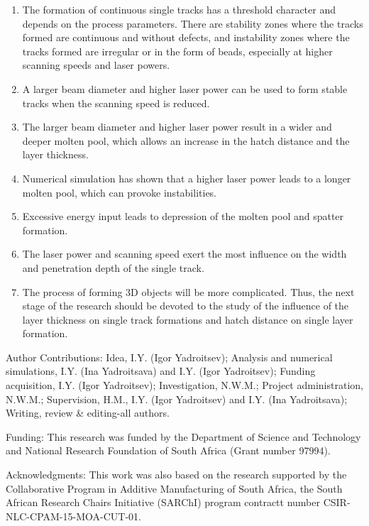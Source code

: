 \documentclass[10pt]{article}
\begin{document}
\begin{enumerate}
  \item The formation of continuous single tracks has a threshold character and depends on the process parameters. There are stability zones where the tracks formed are continuous and without defects, and instability zones where the tracks formed are irregular or in the form of beads, especially at higher scanning speeds and laser powers.

  \item A larger beam diameter and higher laser power can be used to form stable tracks when the scanning speed is reduced.

  \item The larger beam diameter and higher laser power result in a wider and deeper molten pool, which allows an increase in the hatch distance and the layer thickness.

  \item Numerical simulation has shown that a higher laser power leads to a longer molten pool, which can provoke instabilities.

  \item Excessive energy input leads to depression of the molten pool and spatter formation.

  \item The laser power and scanning speed exert the most influence on the width and penetration depth of the single track.

  \item The process of forming 3D objects will be more complicated. Thus, the next stage of the research should be devoted to the study of the influence of the layer thickness on single track formations and hatch distance on single layer formation.

\end{enumerate}

Author Contributions: Idea, I.Y. (Igor Yadroitsev); Analysis and numerical simulations, I.Y. (Ina Yadroitsava) and I.Y. (Igor Yadroitsev); Funding acquisition, I.Y. (Igor Yadroitsev); Investigation, N.W.M.; Project administration, N.W.M.; Supervision, H.M., I.Y. (Igor Yadroitsev) and I.Y. (Ina Yadroitsava); Writing, review \& editing-all authors.

Funding: This research was funded by the Department of Science and Technology and National Research Foundation of South Africa (Grant number 97994).

Acknowledgments: This work was also based on the research supported by the Collaborative Program in Additive Manufacturing of South Africa, the South African Research Chairs Initiative (SARChI) program contractt number CSIR-NLC-CPAM-15-MOA-CUT-01.
\end{document}
